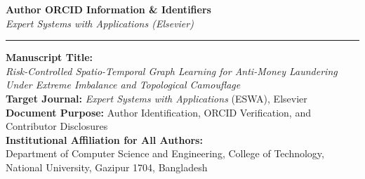 \documentclass[a4paper,10pt]{article}
\begin{document}
\pagestyle{empty}

\begin{center}
    {\Large \textbf{Author ORCID Information \& Identifiers}}\\[0.8ex]
    {\normalsize \textit{Expert Systems with Applications (Elsevier)}}\\[0.6ex]
    \rule{\textwidth}{0.8pt}
\end{center}

\vspace{0.8ex}

\noindent\textbf{Manuscript Title:} \\
\textit{Risk-Controlled Spatio-Temporal Graph Learning for Anti-Money Laundering Under Extreme Imbalance and Topological Camouflage}\\[1.0ex]
\textbf{Target Journal:} \textit{Expert Systems with Applications} (ESWA), Elsevier\\[0.5ex]
\textbf{Document Purpose:} Author Identification, ORCID Verification, and Contributor Disclosures\\[0.5ex]
\textbf{Institutional Affiliation for All Authors:} \\
Department of Computer Science and Engineering, College of Technology,\\
National University, Gazipur 1704, Bangladesh\\[1.5ex]
\end{document}
